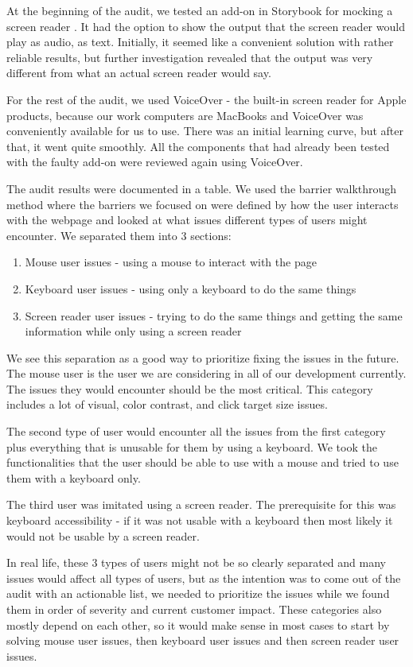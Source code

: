 \documentclass{master_thesis}
\begin{document}
At the beginning of the audit, we tested an add-on in Storybook for mocking a screen reader \citep{Lara}. It had the option to show the output that the screen reader would play as audio, as text. Initially, it seemed like a convenient solution with rather reliable results, but further investigation revealed that the output was very different from what an actual screen reader would say.

For the rest of the audit, we used VoiceOver - the built-in screen reader for Apple products, because our work computers are MacBooks and VoiceOver was conveniently available for us to use. There was an initial learning curve, but after that, it went quite smoothly. All the components that had already been tested with the faulty add-on were reviewed again using VoiceOver.

The audit results were documented in a table. We used the barrier walkthrough method where the barriers we focused on were defined by how the user interacts with the webpage and looked at what issues different types of users might encounter. We separated them into 3 sections:
\begin{enumerate}
	\item Mouse user issues - using a mouse to interact with the page
	\item Keyboard user issues - using only a keyboard to do the same things
	\item Screen reader user issues - trying to do the same things and getting the same information while only using a screen reader
\end{enumerate}

We see this separation as a good way to prioritize fixing the issues in the future. The mouse user is the user we are considering in all of our development currently. The issues they would encounter should be the most critical. This category includes a lot of visual, color contrast, and click target size issues.

The second type of user would encounter all the issues from the first category plus everything that is unusable for them by using a keyboard. We took the functionalities that the user should be able to use with a mouse and tried to use them with a keyboard only.

The third user was imitated using a screen reader. The prerequisite for this was keyboard accessibility - if it was not usable with a keyboard then most likely it would not be usable by a screen reader.

In real life, these 3 types of users might not be so clearly separated and many issues would affect all types of users, but as the intention was to come out of the audit with an actionable list, we needed to prioritize the issues while we found them in order of severity and current customer impact. These categories also mostly depend on each other, so it would make sense in most cases to start by solving mouse user issues, then keyboard user issues and then screen reader user issues.
\end{document}
